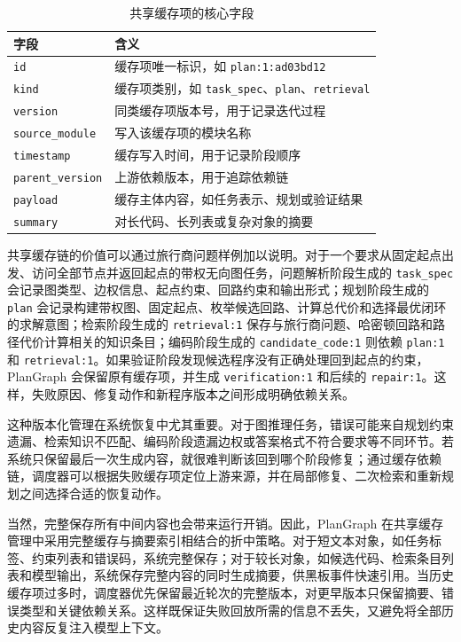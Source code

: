 \begin{table}[htbp]
\centering
\small
\caption{共享缓存项的核心字段}
\label{tab:artifact_fields}
\renewcommand{\arraystretch}{1.15}
\begin{tabularx}{0.78\textwidth}{
>{\raggedright\arraybackslash}p{2.8cm}
>{\raggedright\arraybackslash}X}
\toprule
字段 & 含义 \\
\midrule
\texttt{id} & 缓存项唯一标识，如 \texttt{plan:1:ad03bd12} \\
\texttt{kind} & 缓存项类别，如 \texttt{task\_spec}、\texttt{plan}、\texttt{retrieval} \\
\texttt{version} & 同类缓存项版本号，用于记录迭代过程 \\
\texttt{source\_module} & 写入该缓存项的模块名称 \\
\texttt{timestamp} & 缓存写入时间，用于记录阶段顺序 \\
\texttt{parent\_version} & 上游依赖版本，用于追踪依赖链 \\
\texttt{payload} & 缓存主体内容，如任务表示、规划或验证结果 \\
\texttt{summary} & 对长代码、长列表或复杂对象的摘要 \\
\bottomrule
\end{tabularx}
\end{table}

共享缓存链的价值可以通过旅行商问题样例加以说明。对于一个要求从固定起点出发、访问全部节点并返回起点的带权无向图任务，问题解析阶段生成的 \texttt{task\_spec} 会记录图类型、边权信息、起点约束、回路约束和输出形式；规划阶段生成的 \texttt{plan} 会记录构建带权图、固定起点、枚举候选回路、计算总代价和选择最优闭环的求解意图；检索阶段生成的 \texttt{retrieval:1} 保存与旅行商问题、哈密顿回路和路径代价计算相关的知识条目；编码阶段生成的 \texttt{candidate\_code:1} 则依赖 \texttt{plan:1} 和 \texttt{retrieval:1}。如果验证阶段发现候选程序没有正确处理回到起点的约束，PlanGraph 会保留原有缓存项，并生成 \texttt{verification:1} 和后续的 \texttt{repair:1}。这样，失败原因、修复动作和新程序版本之间形成明确依赖关系。

这种版本化管理在系统恢复中尤其重要。对于图推理任务，错误可能来自规划约束遗漏、检索知识不匹配、编码阶段遗漏边权或答案格式不符合要求等不同环节。若系统只保留最后一次生成内容，就很难判断该回到哪个阶段修复；通过缓存依赖链，调度器可以根据失败缓存项定位上游来源，并在局部修复、二次检索和重新规划之间选择合适的恢复动作。

当然，完整保存所有中间内容也会带来运行开销。因此，PlanGraph 在共享缓存管理中采用完整缓存与摘要索引相结合的折中策略。对于短文本对象，如任务标签、约束列表和错误码，系统完整保存；对于较长对象，如候选代码、检索条目列表和模型输出，系统保存完整内容的同时生成摘要，供黑板事件快速引用。当历史缓存项过多时，调度器优先保留最近轮次的完整版本，对更早版本只保留摘要、错误类型和关键依赖关系。这样既保证失败回放所需的信息不丢失，又避免将全部历史内容反复注入模型上下文。

